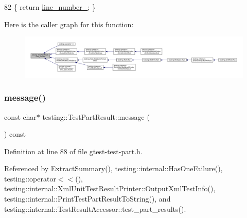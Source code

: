 \begin{DoxyCode}
82 \{ \textcolor{keywordflow}{return} \hyperlink{classtesting_1_1TestPartResult_a7a988009362bcdc28d3b801fc6059b5e}{line\_number\_}; \}
\end{DoxyCode}
Here is the caller graph for this function\+:
\nopagebreak
\begin{figure}[H]
\begin{center}
\leavevmode
\includegraphics[width=350pt]{classtesting_1_1TestPartResult_ad4c5da5f13245ac18cf256d0d9f3eda9_icgraph}
\end{center}
\end{figure}
\mbox{\label{classtesting_1_1TestPartResult_a5019dc9d753aba5949777270de255d49}} 
\subsubsection{\texorpdfstring{message()}{message()}}
{\footnotesize\ttfamily const char$\ast$ testing\+::\+Test\+Part\+Result\+::message (\begin{DoxyParamCaption}{ }\end{DoxyParamCaption}) const\hspace{0.3cm}{\ttfamily [inline]}}



Definition at line 88 of file gtest-\/test-\/part.\+h.



Referenced by Extract\+Summary(), testing\+::internal\+::\+Has\+One\+Failure(), testing\+::operator$<$$<$(), testing\+::internal\+::\+Xml\+Unit\+Test\+Result\+Printer\+::\+Output\+Xml\+Test\+Info(), testing\+::internal\+::\+Print\+Test\+Part\+Result\+To\+String(), and testing\+::internal\+::\+Test\+Result\+Accessor\+::test\+\_\+part\+\_\+results().


